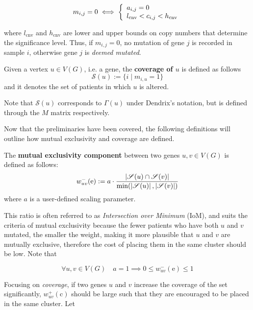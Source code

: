 \begin{equation}
    m_{i, j} = 0 \iff \soe{l}{a_{i, j} = 0 \\ l_{\mathrm{cnv}} < c_{i, j} < h_{\mathrm{cnv}}}
\end{equation}

where $l_{\mathrm{cnv}}$ and $h_{\mathrm{cnv}}$ are lower and upper bounds on copy numbers that determine the significance level. Thus, if $m_{i, j} = 0$, no mutation of gene $j$ is recorded in sample $i$, otherwise gene $j$ is \textit{deemed mutated}.

\begin{definition}
    Given a vertex $u \in V(G)$, i.e. a gene, the \textbf{coverage of $u$} is defined as follows $$\mathscr{S}(u) := \{i \mid m_{i, u} = 1\}$$ and it denotes the set of patients in which $u$ is altered.
\end{definition}

Note that $\mathscr{S}(u)$ corresponds to $\Gamma(u)$ under Dendrix's notation, but is defined through the $M$ matrix respectively.

Now that the preliminaries have been covered, the following definitions will outline how mutual exclusivity and coverage are defined.

\begin{definition} \label{me_comp}
    The \textbf{mutual exclusivity component} between two genes $u, v \in V(G)$ is defined as follows: $$w_{uv}^-(\mathrm e) := a \cdot \dfrac{\abs{\mathscr{S}(u) \cap \mathscr{S}(v)}}{\min(\abs{\mathscr{S}(u)}, \abs{\mathscr{S}(v)})}$$ where $a$ is a user-defined scaling parameter.
\end{definition}

This ratio is often referred to as \textit{Intersection over Minimum} (IoM), and suits the criteria of mutual exclusivity because the fewer patients who have both $u$ and $v$ mutated, the smaller the weight, making it more plausible that $u$ and $v$ are mutually exclusive, therefore the cost of placing them in the same cluster should be low. Note that

\begin{equation}\label{neg_weight_constraint}
    \forall u, v \in V(G) \quad a = 1 \implies 0 \le w_{uv}^-(\mathrm e) \le 1
\end{equation}

Focusing on \textit{coverage}, if two genes $u$ and $v$ increase the coverage of the set significantly, $w_{uv}^+(\mathrm c)$ should be large such that they are encouraged to be placed in the same cluster. Let

